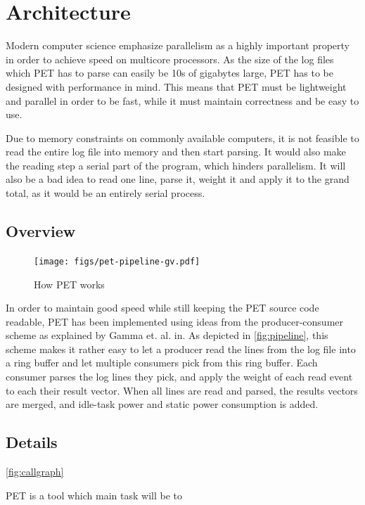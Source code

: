 \section{Architecture}

Modern computer science emphasize parallelism as a highly important property in
order to achieve speed on multicore processors. As the size of the log files
which PET has to parse can easily be 10s of gigabytes large, PET has to be
designed with performance in mind. This means that PET must be lightweight and parallel
in order to be fast, while it must maintain correctness and be easy to use.

Due to memory constraints on commonly available computers, it is not feasible to read the entire log
file into memory and then start parsing. It would also make the reading step a serial part of the program,
which hinders parallelism. It will also be a bad idea to read one line, parse
it, weight it and apply it to the grand total, as it would be an entirely serial process.

\subsection{Overview}

\begin{figure}[ht]
    \texttt{[image: figs/pet-pipeline-gv.pdf]}
    \caption{How PET works}
    \label{fig:pipeline}
\end{figure}

In order to maintain good speed while still keeping the PET source code
readable, PET has been implemented using ideas from the producer-consumer scheme
as explained by Gamma et.  al.  in\cite{designpatterns}. As depicted in
\autoref{fig:pipeline}, this scheme makes it rather easy to let a producer read
the lines from the log file into a ring buffer and let multiple consumers pick
from this ring buffer. Each consumer parses the log lines they pick, and apply
the weight of each read event to each their result vector. When all lines are
read and parsed, the results vectors are merged, and idle-task power and static
power consumption is added.

\subsection{Details}


\autoref{fig:callgraph}


PET is a tool which main task will be to 

